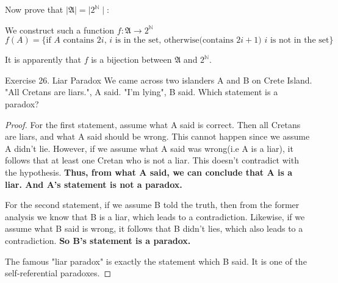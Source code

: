\documentclass[UTF8, a4paper, linespread=1.5]{article}
\begin{document}
Now prove that $\mid\mathfrak A\mid=\mid2^{\mathbb N}\mid$:

We construct such a function $f:\mathfrak A\rightarrow 2^{\mathbb N}$
$$f(A)=\{\text{if $A$ contains $2i$, $i$ is in the set, otherwise(contains $2i+1$) $i$ is not in the set}\}$$

It is apparently that $f$ is a bijection between $\mathfrak A$ and $2^{\mathbb N}$.


\begin{thm}{Exercise 26. Liar Paradox}{}
    We came across two islanders A and B on Crete Island. "All Cretans are liars.", A said. "I'm lying", B said. Which statement is a paradox?
\end{thm}

\begin{proof}
    For the first statement, assume what A said is correct. Then all Cretans are liars, and what A said should be wrong. This cannot happen since we assume A didn't lie. However, if we assume what A said was wrong(i.e A is a liar), it follows that at least one Cretan who is not a liar. This doesn't contradict with the hypothesis. \textbf{Thus, from what A said, we can conclude that A is a liar. And A's statement is not a paradox.}

    For the second statement, if we assume B told the truth, then from the former analysis we know that B is a liar, which leads to a contradiction. Likewise, if we assume what B said is wrong, it follows that B didn't lies, which also leads to a contradiction. \textbf{So B's statement is a paradox.}

    The famous "liar paradox" is exactly the statement which B said. It is one of the self-referential paradoxes.
\end{proof}
\end{document}
